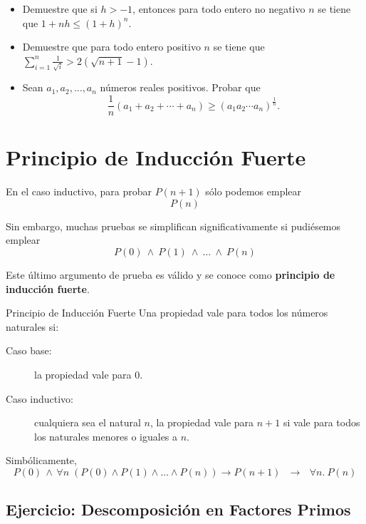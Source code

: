 \begin{itemize}
    \item Demuestre que si $h > -1$, entonces para todo entero no negativo $n$ se tiene que $1+nh \leq (1+h)^n$.
    \item Demuestre que para todo entero positivo $n$ se tiene que $\sum_{i=1}^n \frac{1}{\sqrt{i}} > 2(\sqrt{n+1}-1)$.
    \item Sean $a_1,a_2,\dots,a_n$ números reales positivos. Probar que $$\frac{1}{n} (a_1+a_2+ \cdots + a_n) \geq (a_1 a_2 \cdots a_n)^{\frac{1}{n}}.$$ \end{itemize}


\section{Principio de Inducción Fuerte}

En el caso inductivo, para probar $P(n+1)$ sólo podemos emplear $$P(n)$$

Sin embargo, muchas pruebas se simplifican significativamente si pudiésemos emplear
$$P(0) \:\land\: P(1) \:\land\: \ldots \:\land\: P(n)$$

Este último argumento de prueba es válido y se conoce como \textbf{principio de inducción fuerte}.



\begin{definitionblock}{Principio de Inducción Fuerte}
Una propiedad vale para todos los números naturales si:

\begin{description}
\item[Caso base:] la propiedad vale para $0$.
\item[Caso inductivo:] cualquiera sea el natural $n$, la propiedad vale para $n+1$ si
  vale para todos los naturales menores o iguales a $n$.
\end{description}

Simbólicamente,
$$P(0) \,\wedge\, \forall n \;  ( P(0) \land P(1) \land \ldots \land P(n) ) \rightarrow P(n+1) \ \ \ 
\rightarrow \ \ \ \forall n.\ P(n)$$
\end{definitionblock}


\subsection{Ejercicio: Descomposición en Factores Primos}


